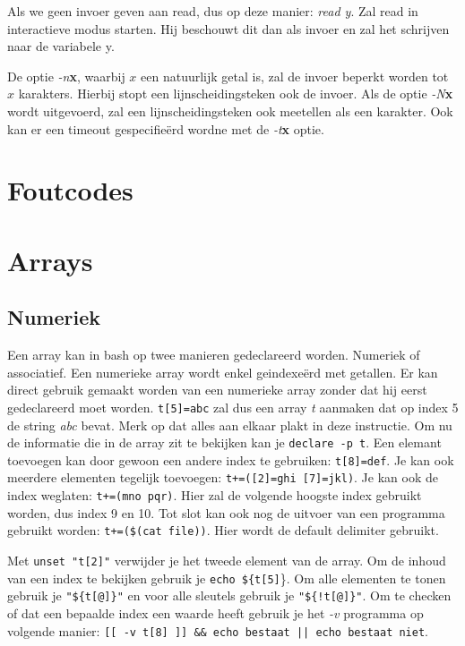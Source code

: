 \documentclass{report}
\begin{document}
Als we geen invoer geven aan read, dus op deze manier: \textit{read y}. Zal read in interactieve modus starten. Hij beschouwt dit dan als invoer en zal het schrijven naar de variabele y.

De optie \textit{-n}\textbf{x}, waarbij $x$ een natuurlijk getal is, zal de invoer beperkt worden tot $x$ karakters. Hierbij stopt een lijnscheidingsteken ook de invoer. Als de optie \textit{-N}\textbf{x} wordt uitgevoerd, zal een lijnscheidingsteken ook meetellen als een karakter. Ook kan er een timeout gespecifieërd wordne met de \textit{-t}\textbf{x} optie.

\section{Foutcodes}

\section{Arrays}
\subsection{Numeriek}
Een array kan in bash op twee manieren gedeclareerd worden. Numeriek of associatief. Een numerieke array wordt enkel geindexeërd met getallen. Er kan direct gebruik gemaakt worden van een numerieke array zonder dat hij eerst gedeclareerd moet worden. \texttt{t[5]=abc} zal dus een array \textit{t} aanmaken dat op index 5 de string \textit{abc} bevat. Merk op dat alles aan elkaar plakt in deze instructie. Om nu de informatie die in de array zit te bekijken kan je \texttt{declare -p t}. Een elemant toevoegen kan door gewoon een andere index te gebruiken: \texttt{t[8]=def}. Je kan ook meerdere elementen tegelijk toevoegen: \texttt{t+=([2]=ghi [7]=jkl)}. Je kan ook de index weglaten: \texttt{t+=(mno pqr)}. Hier zal de volgende hoogste index gebruikt worden, dus index 9 en 10. Tot slot kan ook nog de uitvoer van een programma gebruikt worden: \texttt{t+=(\$(cat file))}. Hier wordt de default delimiter gebruikt.

Met \texttt{unset "t[2]"} verwijder je het tweede element van de array. Om de inhoud van een index te bekijken gebruik je \texttt{echo \$\{t[5]}\}. Om alle elementen te tonen gebruik je \texttt{"\$\{t[@]\}"} en voor alle sleutels gebruik je \texttt{"\$\{!t[@]\}"}. Om te checken of dat een bepaalde index een waarde heeft gebruik je het \textit{-v} programma op volgende manier: \texttt{[[ -v t[8] ]] \&\& echo bestaat || echo bestaat niet}.
\end{document}
